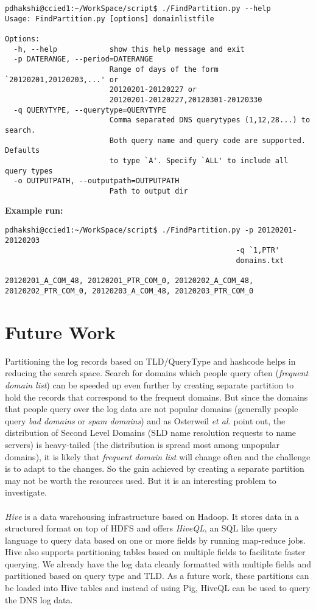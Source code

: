 \documentclass[11pt,a4paper]{article}
\begin{document}
\begin{verbatim}
pdhakshi@ccied1:~/WorkSpace/script$ ./FindPartition.py --help
Usage: FindPartition.py [options] domainlistfile

Options:
  -h, --help            show this help message and exit
  -p DATERANGE, --period=DATERANGE
                        Range of days of the form `20120201,20120203,...' or
                        20120201-20120227 or
                        20120201-20120227,20120301-20120330
  -q QUERYTYPE, --querytype=QUERYTYPE
                        Comma separated DNS querytypes (1,12,28...) to search.
                        Both query name and query code are supported. Defaults
                        to type `A'. Specify `ALL' to include all query types
  -o OUTPUTPATH, --outputpath=OUTPUTPATH
                        Path to output dir
\end{verbatim}
\noindent
\textbf{Example run: }
\begin{verbatim}
pdhakshi@ccied1:~/WorkSpace/script$ ./FindPartition.py -p 20120201-20120203
                                                     -q `1,PTR'
                                                     domains.txt 

20120201_A_COM_48, 20120201_PTR_COM_0, 20120202_A_COM_48, 
20120202_PTR_COM_0, 20120203_A_COM_48, 20120203_PTR_COM_0

\end{verbatim}

\section{Future Work}
Partitioning the log records based on TLD/QueryType and hashcode helps in reducing the search space. Search for domains which people query often (\textit{frequent domain list}) can be speeded up even further by creating separate partition to hold the records that correspond to the frequent domains. But since the domains that people query over the log data are not popular domains (generally people query \textit{bad domains} or \textit{spam domains}) and as Osterweil \textit{et al.}\cite{uspatent} point out, the distribution of Second Level Domains (SLD name resolution requests to name servers) is heavy-tailed (the distribution is spread most among unpopular domains), it is likely that \textit{frequent domain list} will change often and the challenge is to adapt to the changes. So the gain achieved by creating a separate partition may not be worth the resources used. But it is an interesting problem to investigate.
\\\\
\emph{Hive} is a data warehousing infrastructure based on Hadoop. It stores data in a structured format on top of HDFS and offers \textit{HiveQL}, an SQL like query language to query data based on one or more fields by running map-reduce jobs. Hive also supports partitioning tables based on multiple fields to facilitate faster querying. We already have the log data cleanly formatted with multiple fields and partitioned based on query type and TLD. As a future work, these partitions can be loaded into Hive tables and instead of using Pig, HiveQL can be used to query the DNS log data. 
\end{document}
